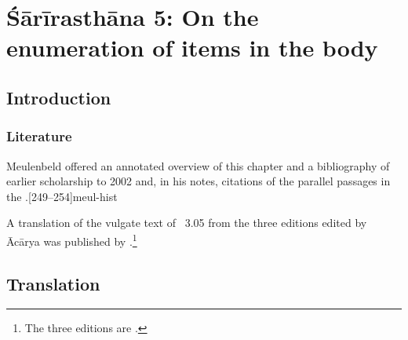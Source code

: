 
\chapter{Śārīrasthāna 5:  On the enumeration of items in the body}


\section{Introduction}



\subsection{Literature}

Meulenbeld offered an annotated overview of this chapter and a
bibliography of earlier scholarship to 2002 and, in his notes, citations
of the parallel passages in the \CS.[249--254]{meul-hist}   

A translation of the  vulgate text of \SS\ 3.05 from the three
editions edited by Ācārya was published by
\citet[697--705]{zysk-1986}.\footnote{The three editions are
    \cite{susr-trikamji1,susr-trikamji2,susr-trikamji1945}.}

\newpage

\section{Translation}

